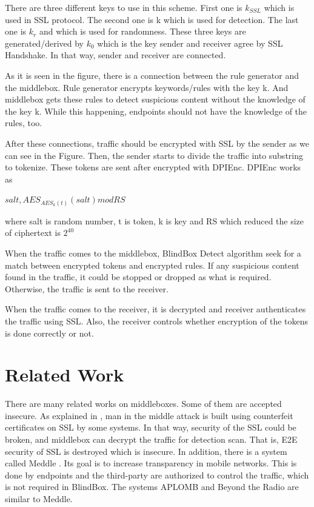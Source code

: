 \documentclass{winslabreport}
\begin{document}
There are three different keys to use in this scheme. First one is $k_{SSL}$ which is used in SSL protocol. The second one is k which is used for detection. The last one is $k_r$ and which is used for randomness. These three keys are generated/derived by $k_0$ which is the key sender and receiver agree by SSL Handshake. In that way, sender and receiver are connected.

As it is seen in the figure, there is a connection between the rule generator and the middlebox. Rule generator encrypts keywords/rules with the key k. And middlebox gets these rules to detect suspicious content without the knowledge of the key k. While this happening, endpoints should not have the knowledge of the rules, too.

After these connections, traffic should be encrypted with SSL by the sender as we can see in the Figure. Then, the sender starts to divide the traffic into substring to tokenize. These tokens are sent after encrypted with DPIEnc. DPIEnc works as

\begin{center}
	$salt ,  AES_{AES_k (t)}(salt)  mod RS$
\end{center}

where salt is random number, t is token, k is key and  RS which reduced the size of ciphertext is $2^{40}$

When the traffic comes to the middlebox, BlindBox Detect algorithm seek for a match between encrypted tokens and encrypted rules. If any suspicious content found in the traffic, it could be stopped or dropped as what is required. Otherwise, the traffic is sent to the receiver.

When the traffic comes to the receiver, it is decrypted and receiver authenticates the traffic using SSL. Also, the receiver controls whether encryption of the tokens is done correctly or not. 

\section{ Related Work}

There are many related works on middleboxes. Some of them are accepted insecure. As explained in \cite{SSL} , man in the middle attack is built using counterfeit certificates on SSL by some systems. In that way, security of the SSL could be broken, and middlebox can decrypt the traffic for detection scan. That is, E2E security of SSL is destroyed which is insecure. In addition, there is a system called Meddle \cite{Traffic}. Its goal is to increase transparency in mobile networks. This is done by endpoints and the third-party are authorized to control the traffic, which is not required in BlindBox. The systems APLOMB \cite{Network} and Beyond the Radio \cite{48} are similar to Meddle.
\end{document}
